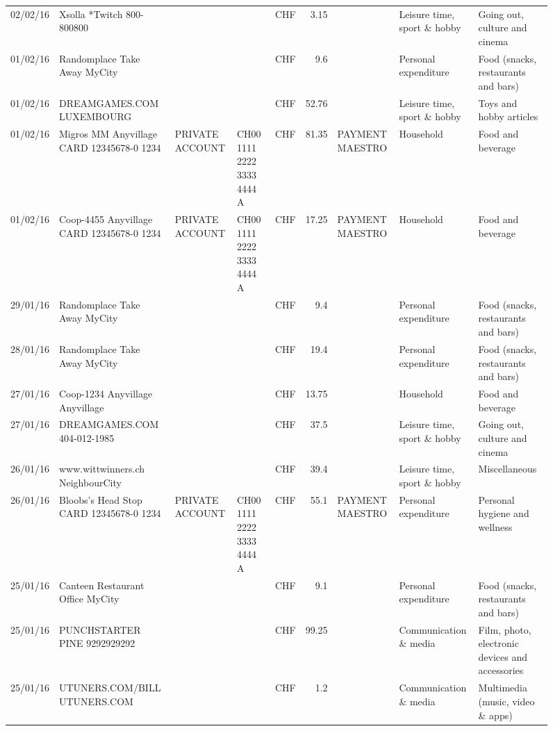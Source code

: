 \begin{landscape}
\begin{sidewaysfigure}
\begin{table}[h]
\begin{center}
\begin{tabular}{rllllrlll}
		02/02/16 & Xsolla *Twitch           800-800800 &       &       & CHF   & 3.15  &       & Leisure time, sport \& hobby & Going out, culture and cinema \\
		01/02/16 & Randomplace Take Away     MyCity &       &       & CHF   & 9.6   &       & Personal expenditure & Food (snacks, restaurants and bars) \\
		01/02/16 & DREAMGAMES.COM           LUXEMBOURG &       &       & CHF   & 52.76 &       & Leisure time, sport \& hobby & Toys and hobby articles \\
		01/02/16 & Migros MM Anyvillage CARD 12345678-0 1234 & PRIVATE ACCOUNT & CH00 1111 2222 3333 4444 A & CHF   & 81.35 & PAYMENT MAESTRO & Household & Food and beverage \\
		01/02/16 & Coop-4455 Anyvillage CARD 12345678-0 1234 & PRIVATE ACCOUNT & CH00 1111 2222 3333 4444 A & CHF   & 17.25 & PAYMENT MAESTRO & Household & Food and beverage \\
		29/01/16 & Randomplace Take Away     MyCity &       &       & CHF   & 9.4   &       & Personal expenditure & Food (snacks, restaurants and bars) \\
		28/01/16 & Randomplace Take Away     MyCity &       &       & CHF   & 19.4  &       & Personal expenditure & Food (snacks, restaurants and bars) \\
		27/01/16 & Coop-1234 Anyvillage    Anyvillage &       &       & CHF   & 13.75 &       & Household & Food and beverage \\
		27/01/16 & DREAMGAMES.COM           404-012-1985 &       &       & CHF   & 37.5  &       & Leisure time, sport \& hobby & Going out, culture and cinema \\
		26/01/16 & www.wittwinners.ch        NeighbourCity &       &       & CHF   & 39.4  &       & Leisure time, sport \& hobby & Miscellaneous \\
		26/01/16 & Bloobs's Head Stop CARD 12345678-0 1234 & PRIVATE ACCOUNT & CH00 1111 2222 3333 4444 A & CHF   & 55.1  & PAYMENT MAESTRO & Personal expenditure & Personal hygiene and wellness \\
		25/01/16 & Canteen Restaurant Office      MyCity &       &       & CHF   & 9.1   &       & Personal expenditure & Food (snacks, restaurants and bars) \\
		25/01/16 & PUNCHSTARTER PINE   9292929292 &       &       & CHF   & 99.25 &       & Communication \& media & Film, photo, electronic devices and accessories \\
		25/01/16 & UTUNERS.COM/BILL          UTUNERS.COM &       &       & CHF   & 1.2   &       & Communication \& media & Multimedia (music, video \& apps) \\

\end{tabular}
\end{center}
\end{table}
\end{sidewaysfigure}
\end{landscape}
